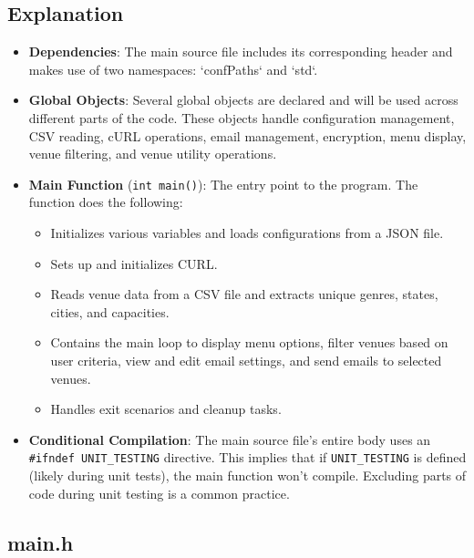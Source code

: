 \documentclass{article}
\begin{document}
	\subsection*{Explanation}
	\begin{itemize}
		\item \textbf{Dependencies}: The main source file includes its corresponding header and makes use of two namespaces: `confPaths` and `std`.
		
		\item \textbf{Global Objects}: Several global objects are declared and will be used across different parts of the code. These objects handle configuration management, CSV reading, cURL operations, email management, encryption, menu display, venue filtering, and venue utility operations.
		
		\item \textbf{Main Function} (\texttt{int main()}): The entry point to the program. The function does the following:
		\begin{itemize}
			\item Initializes various variables and loads configurations from a JSON file.
			
			\item Sets up and initializes CURL.
			
			\item Reads venue data from a CSV file and extracts unique genres, states, cities, and capacities.
			
			\item Contains the main loop to display menu options, filter venues based on user criteria, view and edit email settings, and send emails to selected venues.
			
			\item Handles exit scenarios and cleanup tasks.
		\end{itemize}
		
			\item \textbf{Conditional Compilation}: The main source file's entire body uses an \texttt{\#ifndef UNIT\_TESTING} directive. This implies that if \texttt{UNIT\_TESTING} is defined (likely during unit tests), the main function won't compile. Excluding parts of code during unit testing is a common practice.
	\end{itemize}
	
	\subsection{main.h}
	
\end{document}

